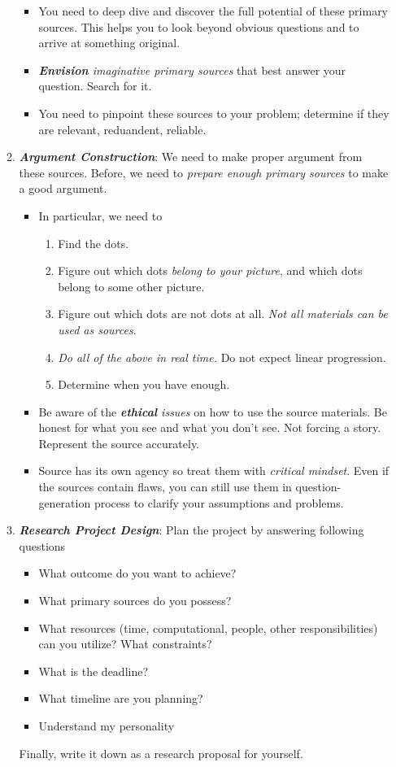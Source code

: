 \documentclass[11pt]{article}
\begin{document}
\begin{itemize}
\begin{enumerate}
\begin{itemize}
\item You need to deep dive and discover the full potential of these primary sources.  This helps you to look beyond obvious questions and to arrive at something original.

\item \emph{\textbf{Envision} imaginative primary sources} that best answer your question. Search for it.

\item You need to pinpoint these sources to your problem; determine if they are relevant, reduandent, reliable. 
\end{itemize}

\item \emph{\textbf{Argument Construction}}: We need to make proper argument from these sources. Before, we need to \emph{prepare enough primary sources} to make a good argument. 
\begin{itemize}
\item In particular, we need to 
\begin{enumerate}
\item Find the dots. 
\item Figure out which dots \emph{belong to your picture}, and which dots belong to some other picture. 
\item Figure out which dots are not dots at all. \emph{Not all materials can be used as sources}. 
\item \emph{Do all of the above in real time.} Do not expect linear progression. 
\item Determine when you have enough.
\end{enumerate}

\item Be aware of the \emph{\textbf{ethical} issues} on how to use the source materials. Be honest for what you see and what you don't see. Not forcing a story. Represent the source accurately. 

\item Source has its own agency so treat them with \emph{critical mindset}. Even if the sources contain flaws, you can still use them in question-generation process to clarify your assumptions and problems. 
\end{itemize}
 



\item  \emph{\textbf{Research Project Design}}: Plan the project by answering following questions
\begin{itemize}
\item What outcome do you want to achieve? 
\item What primary sources do you possess? 
\item What resources (time, computational, people, other responsibilities) can you utilize? What constraints? 
\item What is the deadline? 
\item What timeline are you planning?
\item Understand my personality
\end{itemize} Finally, write it down as a research proposal for yourself.


\end{enumerate}
\end{itemize}
\end{document}
